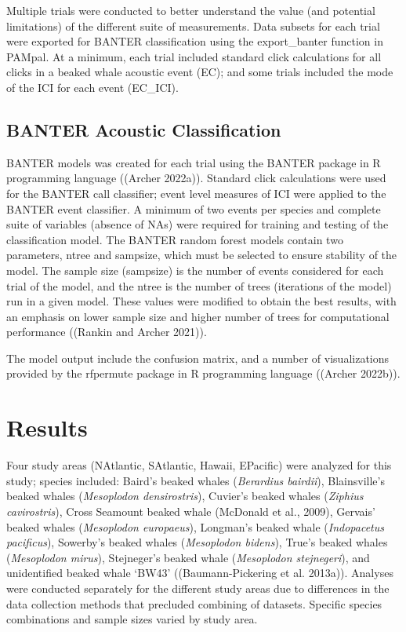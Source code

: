 \documentclass[
  letterpaper,
  DIV=11,
  numbers=noendperiod]{scrartcl}
\begin{document}
Multiple trials were conducted to better understand the value (and
potential limitations) of the different suite of measurements. Data
subsets for each trial were exported for BANTER classification using the
export\_banter function in PAMpal. At a minimum, each trial included
standard click calculations for all clicks in a beaked whale acoustic
event (EC); and some trials included the mode of the ICI for each event
(EC\_ICI).

\hypertarget{banter-acoustic-classification}{%
\subsection{BANTER Acoustic
Classification}\label{banter-acoustic-classification}}

BANTER models was created for each trial using the BANTER package in R
programming language ((Archer 2022a)). Standard click calculations were
used for the BANTER call classifier; event level measures of ICI were
applied to the BANTER event classifier. A minimum of two events per
species and complete suite of variables (absence of NAs) were required
for training and testing of the classification model. The BANTER random
forest models contain two parameters, ntree and sampsize, which must be
selected to ensure stability of the model. The sample size (sampsize) is
the number of events considered for each trial of the model, and the
ntree is the number of trees (iterations of the model) run in a given
model. These values were modified to obtain the best results, with an
emphasis on lower sample size and higher number of trees for
computational performance ((Rankin and Archer 2021)).

The model output include the confusion matrix, and a number of
visualizations provided by the rfpermute package in R programming
language ((Archer 2022b)).

\hypertarget{results}{%
\section{Results}\label{results}}

Four study areas (NAtlantic, SAtlantic, Hawaii, EPacific) were analyzed
for this study; species included: Baird's beaked whales (\emph{Berardius
bairdii}), Blainsville's beaked whales (\emph{Mesoplodon densirostris}),
Cuvier's beaked whales (\emph{Ziphius cavirostris}), Cross Seamount
beaked whale (McDonald et al., 2009), Gervais' beaked whales
(\emph{Mesoplodon europaeus}), Longman's beaked whale (\emph{Indopacetus
pacificus}), Sowerby's beaked whales (\emph{Mesoplodon bidens}), True's
beaked whales (\emph{Mesoplodon mirus}), Stejneger's beaked whale
(\emph{Mesoplodon stejnegeri}), and unidentified beaked whale `BW43'
((Baumann-Pickering et al. 2013a)). Analyses were conducted separately
for the different study areas due to differences in the data collection
methods that precluded combining of datasets. Specific species
combinations and sample sizes varied by study area.
\end{document}
